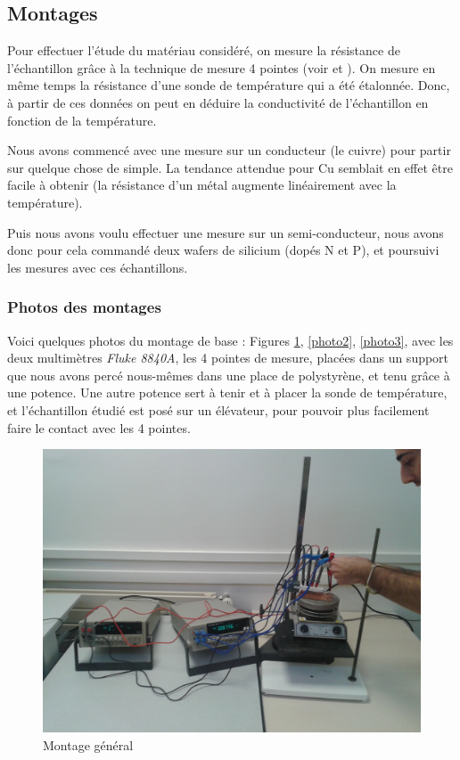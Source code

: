 \subsection{Montages}
Pour effectuer l'étude du matériau considéré, on mesure la résistance de l'échantillon grâce à la technique de mesure 4 pointes (voir \cite{philipsgloeilampenfabrieken_method_1958} et \cite{smits_measurement_1958}).
On mesure en même temps la résistance d'une sonde de température qui a été étalonnée.
Donc, à partir de ces données on peut en déduire la conductivité de l'échantillon en fonction de la température.

Nous avons commencé avec une mesure sur un conducteur (le cuivre) pour partir sur quelque chose de simple.
La tendance attendue pour Cu semblait en effet être facile à obtenir (la résistance d'un métal augmente linéairement avec la température).

Puis nous avons voulu effectuer une mesure sur un semi-conducteur, nous avons donc pour cela commandé deux wafers de silicium (dopés N et P), et poursuivi les mesures avec ces échantillons.

\subsubsection{Photos des montages}

Voici quelques photos du montage de base : Figures \ref{photo1}, \ref{photo2}, \ref{photo3}, avec les deux multimètres \emph{Fluke 8840A}, les 4 pointes de mesure, placées dans un support que nous avons percé nous-mêmes dans une place de polystyrène, et tenu grâce à une potence. Une autre potence sert à tenir et à placer la sonde de température, et l'échantillon étudié est posé sur un élévateur, pour pouvoir plus facilement faire le contact avec les 4 pointes.

\begin{figure}[hb]
  \begin{center}
		\includegraphics[width=12cm]{./images/photo1.jpg}
		\caption{Montage général}
		\label{photo1}
	\end{center}
\end{figure}

